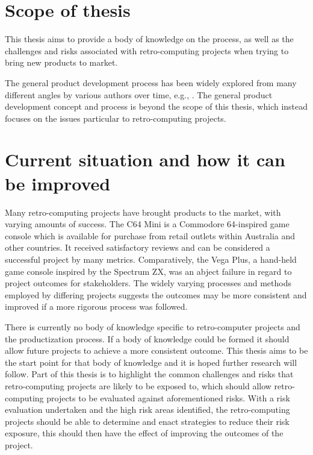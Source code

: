 \section{Scope of thesis}
This thesis aims to provide a body of knowledge on the process, as well as the challenges and risks associated with retro-computing projects when trying to bring new products to market. 

The general product development process has been widely explored from many different angles by various authors over time, e.g., \cite{veryzer1998discontinuous,imai1984managing,schilling1998managing,morgan2006toyota,zahay2018managerial,sommer2015improved,stark2015product,rajagopalan2017exploring,chahin2016practical}.  The general product development concept and process is beyond the scope of this thesis, which instead focuses on the issues particular to retro-computing projects.

\section{Current situation and how it can be improved}
Many retro-computing projects have brought products to the market, with varying amounts of success. The C64 Mini is a Commodore 64-inspired game console which is available for purchase from retail outlets within Australia and other countries. It received satisfactory reviews and can be considered a successful project by many metrics. Comparatively, the Vega Plus, a hand-held game console inspired by the Spectrum ZX, was an abject failure in regard to project outcomes for stakeholders. The widely varying processes and methods employed by differing projects suggests the outcomes may be more consistent and improved if a more rigorous process was followed. 

There is currently no body of knowledge specific to retro-computer projects and the productization process. If a body of knowledge could be formed it should allow future projects to achieve a more consistent outcome. This thesis aims to be the start point for that body of knowledge and it is hoped further research will follow. Part of this thesis is to highlight the common challenges and risks that retro-computing projects are likely to be exposed to, which should allow retro-computing projects to be evaluated against aforementioned risks. With a risk evaluation undertaken and the high risk areas identified, the retro-computing projects should be able to determine and enact strategies to reduce their risk exposure, this should then have the effect of improving the outcomes of the project.

